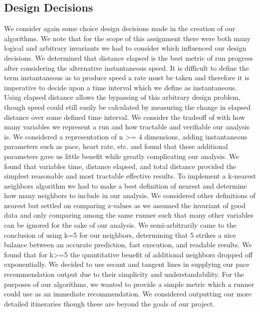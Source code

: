 \documentclass[twoside]{article}
\begin{document}
\begin{multicols}{2}
\subsection{Design Decisions}
	We consider again some choice design decisions made in the creation of our algorithms.  We note that for the scope of this assignment there were both many logical and arbitrary invariants we had to consider which influenced our design decisions.
	We determined that distance elapsed is the best metric of run progress after considering the alternative instantaneous speed.  It is difficult to define the term instantaneous as to produce speed a rate must be taken and therefore it is imperative to decide upon a time interval which we define as instantaneous.  Using elapsed distance allows the bypassing of this arbitrary design problem, though speed could still easily be calculated by measuring the change in elapsed distance over some defined time interval.
	We consider the tradeoff of with how many variables we represent a run and how tractable and verifiable our analysis is.  We considered a representation of n >= 4 dimensions, adding instantaneous parameters such as pace, heart rate, etc. and found that these additional parameters gave us little benefit while greatly complicating our analysis.  We found that variables time, distance elapsed, and total distance provided the simplest reasonable and most tractable effective results.
	To implement a k-nearest neighbors algorithm we had to make a best definition of nearest and determine how many neighbors to include in our analysis.  We considered other definitions of nearest but settled on comparing z-values as we assumed the invariant of good data and only comparing among the same runner such that many other variables can be ignored for the sake of our analysis.  We semi-arbitrarily came to the conclusion of using k=5 for our neighbors, determining that 5 strikes a nice balance between an accurate prediction, fast execution, and readable results.  We found that for k>=5 the quantitative benefit of additional neighbors dropped off exponentially.
	We decided to use secant and tangent lines in supplying our pace recommendation output due to their simplicity and understandability. For the purposes of our algorithms, we wanted to provide a simple metric which a runner could use as an immediate recommendation.  We considered outputting our more detailed itineraries though these are beyond the goals of our project.





\end{multicols}
\end{document}
